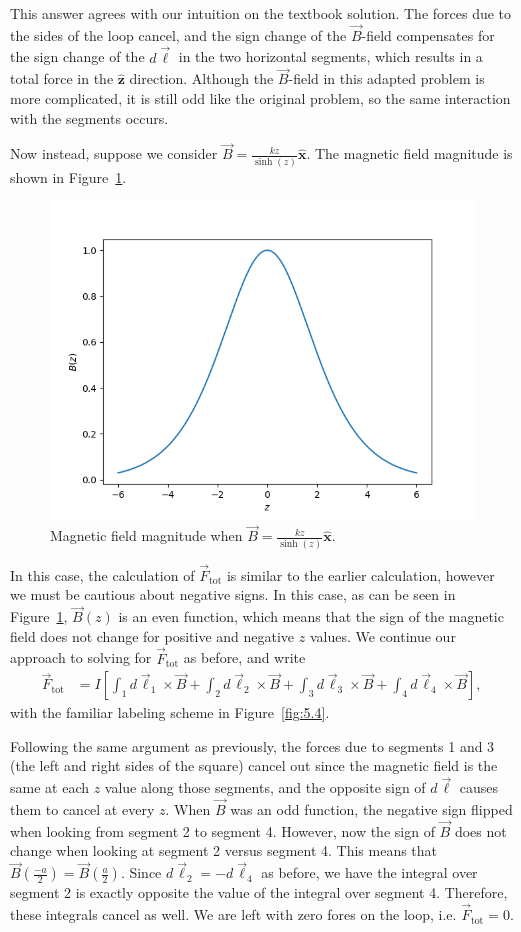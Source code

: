 \documentclass{article}
\newcommand{\xhat}{\hat{\textbf{x}}}
\newcommand{\zhat}{\hat{\textbf{z}}}
\begin{document}
This answer agrees with our intuition on the textbook solution. The forces due to the sides of the loop cancel, and the sign change of the $\vec{B}$-field compensates for the sign change of the $d\vec{\ell}$ in the two horizontal segments, which results in a total force in the $\zhat$ direction. Although the $\vec{B}$-field in this adapted problem is more complicated, it is still odd like the original problem, so the same interaction with the segments occurs.

\clearpage
Now instead, suppose we consider $\vec{B} = \frac{kz}{\sinh(z)}\xhat$. The magnetic field magnitude is shown in Figure~\ref{fig:B_sinh}.
\begin{figure}[htbp]
	\centering
	\includegraphics[width = .5\textwidth]{BFieldSinh.png}
	\caption{Magnetic field magnitude when $\vec{B} = \frac{kz}{\sinh(z)}\xhat$.}\label{fig:B_sinh}
\end{figure}

In this case, the calculation of $\vec{F}_\textrm{tot}$ is similar to the earlier calculation, however we must be cautious about negative signs. In this case, as can be seen in Figure~\ref{fig:B_sinh}, $\vec{B}(z)$ is an even function, which means that the sign of the magnetic field does not change for positive and negative $z$ values. We continue our approach to solving for $\vec{F}_\textrm{tot}$ as before, and write
\begin{align}
	\vec{F}_\textrm{tot} &= I\left[ \int_1d\vec{\ell}_1\times\vec{B} + \int_2d\vec{\ell}_2\times\vec{B} + \int_3d\vec{\ell}_3\times\vec{B} + \int_4d\vec{\ell}_4\times\vec{B} \right],
\end{align}
with the familiar labeling scheme in Figure~\ref{fig:5.4}.


Following the same argument as previously, the forces due to segments 1 and 3 (the left and right sides of the square) cancel out since the magnetic field is the same at each $z$ value along those segments, and the opposite sign of $d\vec{\ell}$ causes them to cancel at every $z$. When $\vec{B}$ was an odd function, the negative sign flipped when looking from segment 2 to segment 4. However, now the sign of $\vec{B}$ does not change when looking at segment 2 versus segment 4. This means that $\vec{B}\left(\frac{-a}{2}\right) = \vec{B}\left(\frac{a}{2}\right)$. Since $d\vec{\ell}_2 = -d\vec{\ell}_4$ as before, we have the integral over segment 2 is exactly opposite the value of the integral over segment 4. Therefore, these integrals cancel as well. We are left with zero fores on the loop, i.e. $\boxed{\vec{F}_\textrm{tot} = 0}$. 
\end{document}
